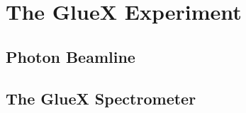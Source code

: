 \section{The GlueX Experiment}
\label{p2}

\subsection{Photon Beamline}

\subsection{The GlueX Spectrometer}
